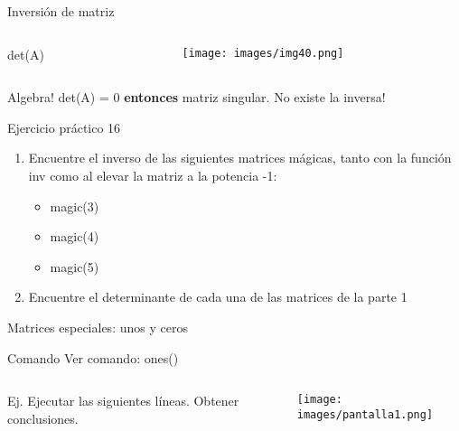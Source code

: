 \documentclass{bredelebeamer}
\begin{document}
\begin{frame}{Inversión de matriz}
\begin{columns}
\begin{column}{0.5\textwidth}
\begin{center}
\LARGE det(A)
\end{center}
\end{column}
\begin{column}{0.5\textwidth}
\begin{center}
\texttt{[image: images/img40.png]}
\end{center}
\end{column}
\end{columns}
\begin{alertblock}{Algebra!}
det(A) = 0 \textbf{entonces} matriz singular. No existe la inversa!
\end{alertblock}
\end{frame}

\begin{frame}{Ejercicio práctico 16}
\begin{enumerate}
\item Encuentre el inverso de las siguientes matrices mágicas, tanto con la función inv como al elevar la matriz a la potencia -1:
\begin{itemize}
\item magic(3)
\item magic(4)
\item magic(5)
\end{itemize}
\item Encuentre el determinante de cada una de las matrices de la parte 1
\end{enumerate}
\end{frame}

\begin{frame}{Matrices especiales: unos y ceros}
\begin{exampleblock}{Comando}
Ver comando: ones()
\end{exampleblock}
\begin{columns}
\begin{column}{0.5\textwidth}
Ej. Ejecutar las siguientes líneas. Obtener conclusiones.

\end{column}
\begin{column}{0.5\textwidth}
\begin{center}
\texttt{[image: images/pantalla1.png]}
\end{center}
\end{column}
\end{columns}
\end{frame}
\end{document}

